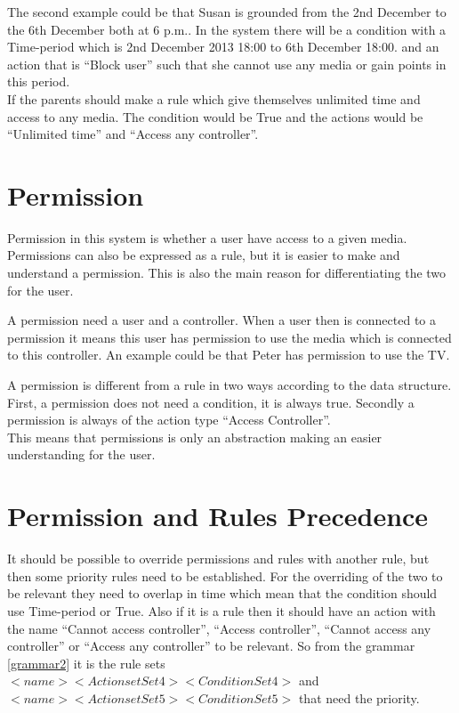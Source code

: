 The second example could be that Susan is grounded from the 2nd December to the 6th December both at 6 p.m.. In the system there will be a condition with a Time-period which is 2nd December 2013 18:00 to 6th December 18:00.
and an action that is ``Block user'' such that she cannot use any media or gain points in this period. \\

If the parents should make a rule which give themselves unlimited time and access to any media. The condition would be True and the actions would be ``Unlimited time'' and ``Access any controller''.\\


\section{Permission}
Permission in this system is whether a user have access to a given media. Permissions can also be expressed as a rule, but it is easier to make and understand a permission. This is also the main reason for differentiating the two for the user. 

A permission need a user and a controller. When a user then is connected to a permission it means this user has permission to use the media which is connected to this controller. An example could be that Peter has permission to use the TV. 

A permission is different from a rule in two ways according to the data structure. First, a permission does not need a condition, it is always true. Secondly a permission is always of the action type ``Access Controller''.\\
This means that permissions is only an abstraction making an easier understanding for the user.


\section{Permission and Rules Precedence}
\label{sec:permissionAndRulesPrecedence}
It should be possible to override permissions and rules with another rule, but then some priority rules  need to be established. 
For the overriding of the two to be relevant they need to overlap in time which mean that the condition should use Time-period or True. Also if it is a rule then it should have an action with the name ``Cannot access controller'', ``Access controller'', ``Cannot access any controller'' or ``Access any controller'' to be relevant. So from the grammar \ref{grammar2} it is the rule sets $<name> <ActionsetSet4><ConditionSet4>$  and $<name> <ActionsetSet5><ConditionSet5>$ that need the priority.

